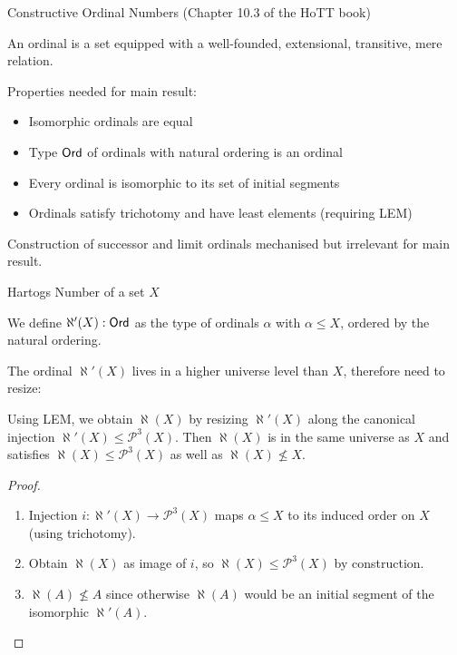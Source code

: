 \documentclass[xcolor=dvipsnames,compress,aspectratio=169,handout]{beamer}
\newcommand{\MCL}[1]{\ensuremath{\mathcal{#1}}\xspace} %
\newcommand{\Pow}{\MCL P}
\begin{document}
\begin{frame}{Constructive Ordinal Numbers (Chapter 10.3 of the HoTT book)}
	\begin{definition}
		An ordinal is a set equipped with a well-founded, extensional, transitive, mere relation.
	\end{definition}

	\vspace{0.5cm}
	Properties needed for main result:
	\begin{itemize}
		\vspace{0.2cm}
		\item
		Isomorphic ordinals are equal
		\vspace{0.2cm}
		\item
		Type $\mathsf{Ord}$ of ordinals with natural ordering is an ordinal
		\vspace{0.2cm}
		\item
		Every ordinal is isomorphic to its set of initial segments
		\vspace{0.2cm}
		\item
		Ordinals satisfy trichotomy and have least elements (requiring LEM)
	\end{itemize}

	\vspace{0.5cm}
	Construction of successor and limit ordinals mechanised but irrelevant for main result.
\end{frame}

\begin{frame}{Hartogs Number of a set $X$}
	\begin{definition}
		We define $\aleph'(X):\mathsf{Ord}$ as the type of ordinals $\alpha$ with $\alpha \le X$, ordered by the natural ordering.
	\end{definition}

	\vspace{0.3cm}
	The ordinal $\aleph'(X)$ lives in a higher universe level than $X$, therefore need to resize:
	
	\begin{theorem}
		Using LEM, we obtain $\aleph(X)$ by resizing $\aleph'(X)$ along the canonical injection $\aleph'(X)\le\Pow^3(X)$.
		Then $\aleph(X)$ is in the same universe as $X$ and satisfies $\aleph(X)\le\Pow^3(X)$ as well as $\aleph(X)\not\le X$.
	\end{theorem}
	\begin{proof}
		\begin{enumerate}
			\item
			Injection $i: \aleph'(X)\to\Pow^3(X)$ maps $\alpha\le X$ to its induced order on $X$ (using trichotomy).
			\item
			Obtain $\aleph(X)$ as image of $i$, so $\aleph(X)\le\Pow^3(X)$ by construction.
			\item
			$\aleph(A)\not\le A$ since otherwise $\aleph(A)$ would be an initial segment of the isomorphic $\aleph'(A)$.
			\qedhere
		\end{enumerate}
	\end{proof}
\end{frame}
\end{document}
